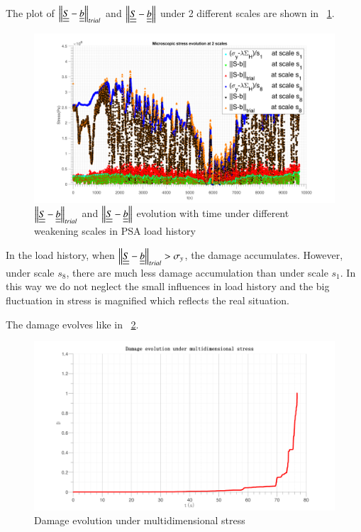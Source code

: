 \documentclass[3p,times,number,review]{elsarticle}
\newcommand{\figref}[1]{\figurename~\ref{#1}}
\begin{document}
 The plot of $\left\|  \uline{\uline{S}}-\uline{\uline{b}}\right\|_{trial}$ and $\left\|  \uline{\uline{S}}-\uline{\uline{b}}\right\|$ under 2 different scales are shown in \figref{trialreal3d}.
\begin{figure}[!h]
	\centering
	\includegraphics[width=\textwidth]{figures//trialreal3d.png} 
	\caption{$\left\|  \uline{\uline{S}}-\uline{\uline{b}}\right\|_{trial}$ and $\left\|  \uline{\uline{S}}-\uline{\uline{b}}\right\|$ evolution with time under different weakening scales in PSA load history}
	\label{trialreal3d}
\end{figure} 



In the load history, when $\left\|  \uline{\uline{S}}-\uline{\uline{b}}\right\|_{trial}>\sigma_y$, the damage accumulates. However, under scale $s_{8}$, there are much less damage accumulation than under scale $s_1$.  In this way we do not neglect the small influences in load history and the big fluctuation in stress is magnified which reflects the real situation. 

The damage evolves like in \figref{dam3d}. 


\begin{figure}[!h]
	\centering
	\includegraphics[width=\textwidth]{figures//damage3d.png} 
	\caption{Damage evolution under multidimensional stress}
	\label{dam3d}
\end{figure}
\end{document}
